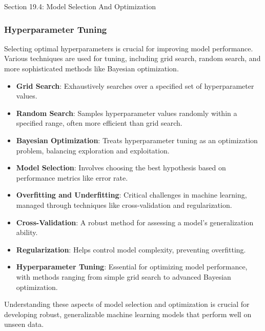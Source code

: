 \begin{notes}{Section 19.4: Model Selection And Optimization}
\begin{highlight}
    \end{highlight}
    
    \subsubsection*{Hyperparameter Tuning}
    
    Selecting optimal hyperparameters is crucial for improving model performance. Various techniques are used for tuning, including grid search, random search, and more sophisticated methods like Bayesian 
    optimization.
    
    \begin{highlight}
    
        \begin{itemize}
            \item \textbf{Grid Search}: Exhaustively searches over a specified set of hyperparameter values.
            \item \textbf{Random Search}: Samples hyperparameter values randomly within a specified range, often more efficient than grid search.
            \item \textbf{Bayesian Optimization}: Treats hyperparameter tuning as an optimization problem, balancing exploration and exploitation.
        \end{itemize}
    
    \end{highlight}
    
    \begin{highlight}
    
        \begin{itemize}
            \item \textbf{Model Selection}: Involves choosing the best hypothesis based on performance metrics like error rate.
            \item \textbf{Overfitting and Underfitting}: Critical challenges in machine learning, managed through techniques like cross-validation and regularization.
            \item \textbf{Cross-Validation}: A robust method for assessing a model's generalization ability.
            \item \textbf{Regularization}: Helps control model complexity, preventing overfitting.
            \item \textbf{Hyperparameter Tuning}: Essential for optimizing model performance, with methods ranging from simple grid search to advanced Bayesian optimization.
        \end{itemize}
    
        Understanding these aspects of model selection and optimization is crucial for developing robust, generalizable machine learning models that perform well on unseen data.
    
    \end{highlight}
\end{notes}

